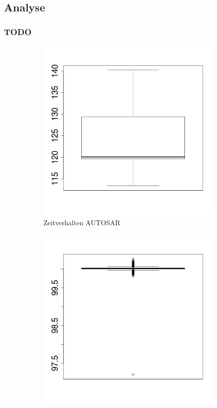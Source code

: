\documentclass[draft]{beamer}
\begin{document}
\subsection{Analyse}
\begin{frame}
\frametitle{TODO}
    \begin{figure}
        \centering
        \begin{subfigure}[b]{0.49\textwidth}
            \centering
            \includegraphics[width=\textwidth]{boxplot_as}
            \caption{Zeitverhalten AUTOSAR}
            \label{fig:boxplot_as}
        \end{subfigure}
        \begin{subfigure}[b]{0.49\textwidth}
            \centering
            \includegraphics[width=\textwidth]{boxplot_vcan}

\end{subfigure}
\end{figure}
\end{frame}
\end{document}
